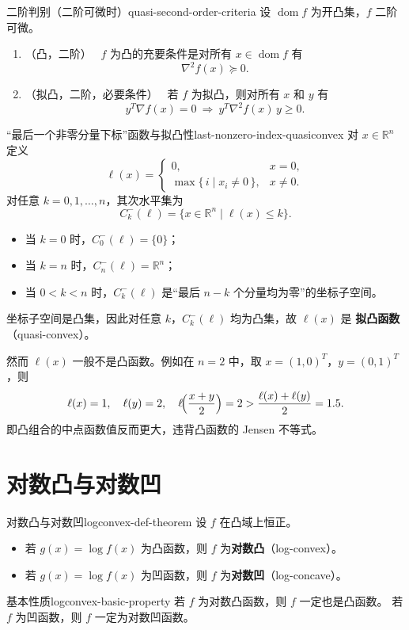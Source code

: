 \documentclass[11pt,a4paper]{article}
\begin{document}
\begin{theorem}{二阶判别（二阶可微时）}{quasi-second-order-criteria}
设 $\operatorname{dom}f$ 为开凸集，$f$ 二阶可微。
\begin{enumerate}[label={(\alph*)}, leftmargin=2.2em]
  \item \textup{（凸，二阶）\ }
  $f$ 为凸的充要条件是对所有 $x\in\operatorname{dom}f$ 有
  \[
  \nabla^2 f(x)\succeq 0.
  \]
  \item \textup{（拟凸，二阶，必要条件）\ }
  若 $f$ 为拟凸，则对所有 $x$ 和 $y$ 有
  \[
  y^T\nabla f(x)=0\ \Longrightarrow\ y^T \nabla^2 f(x)\, y\ge0.
  \]
\end{enumerate}
\end{theorem}

\begin{example}{``最后一个非零分量下标''函数与拟凸性}{last-nonzero-index-quasiconvex}
对 $x\in\mathbb{R}^n$ 定义
\[
\ell(x)=
\begin{cases}
0, & x=0,\\
\max\bigl\{\,i\mid x_i\neq0\,\bigr\}, & x\neq0.
\end{cases}
\]
对任意 $k=0,1,\dots,n$，其次水平集为
\[
C_k^-(\ell)=\bigl\{x\in\mathbb{R}^n\mid \ell(x)\le k\bigr\}.
\]
\begin{itemize}
  \item 当 $k=0$ 时，$C_0^-(\ell)=\{0\}$；
  \item 当 $k=n$ 时，$C_n^-(\ell)=\mathbb{R}^n$；
  \item 当 $0<k<n$ 时，$C_k^-(\ell)$ 是“最后 $n-k$ 个分量均为零”的坐标子空间。
\end{itemize}
坐标子空间是凸集，因此对任意 $k$，$C_k^-(\ell)$ 均为凸集，故 $\ell(x)$ 是
\textbf{拟凸函数}（quasi-convex）。

然而 $\ell(x)$ 一般不是凸函数。例如在 $n=2$ 中，取
$x=(1,0)^T$，$y=(0,1)^T$，则
\[
\ell(x)=1,\quad \ell(y)=2,\quad
\ell\!\Bigl(\frac{x+y}{2}\Bigr)=2>\frac{\ell(x)+\ell(y)}{2}=1.5.
\]
即凸组合的中点函数值反而更大，违背凸函数的 Jensen 不等式。
\end{example}

\section{对数凸与对数凹}\label{sec:ch3-logconvex}

\begin{definition}{对数凸与对数凹}{logconvex-def-theorem}
设 $f$ 在凸域上恒正。
\begin{itemize}
  \item 若 $g(x)=\log f(x)$ 为凸函数，则 $f$ 为\textbf{对数凸}（log-convex）。
  \item 若 $g(x)=\log f(x)$ 为凹函数，则 $f$ 为\textbf{对数凹}（log-concave）。
\end{itemize}
\end{definition}

\begin{remark}{基本性质}{logconvex-basic-property}
若 $f$ 为对数凸函数，则 $f$ 一定也是凸函数。
若 $f$ 为凹函数，则 $f$ 一定为对数凹函数。
\end{remark}
\end{document}
